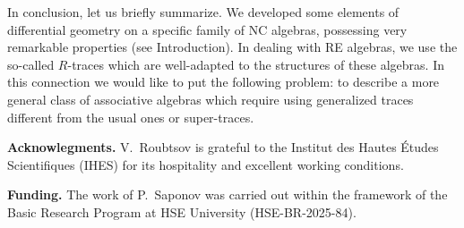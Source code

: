 \documentclass[11pt]{article}
\numberwithin{equation}{section}
\theoremstyle{plain}
\theoremstyle{definition}
\begin{document}
In conclusion, let us briefly summarize. We developed some elements of differential  geometry on a specific family of NC algebras,
possessing very remarkable properties (see Introduction). In dealing with RE algebras, we  use the so-called $R$-traces which are
well-adapted to the structures of these algebras. In this connection we would like to put the following problem: to describe a more
general class of associative algebras which require using generalized traces different from the usual ones or super-traces.

\medskip

\noindent
{\bf Acknowlegments.} V.~Roubtsov is grateful to the Institut des Hautes \'Etudes Scientifiques (IHES) for its hospitality and excellent 
working conditions.

\medskip

\noindent
{\bf Funding.} The work of P.~Saponov was carried out within the framework of the Basic Research Program at HSE University
(HSE-BR-2025-84).
\end{document}
